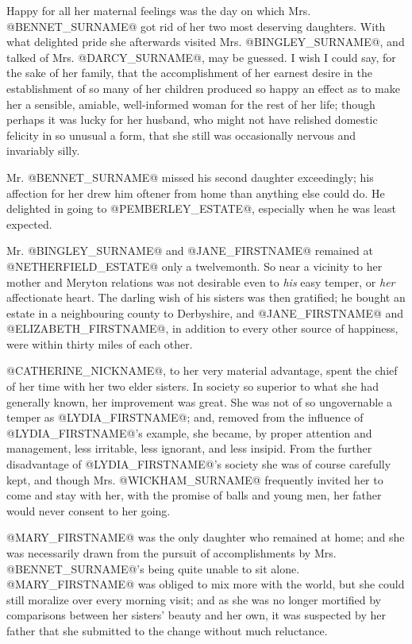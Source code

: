 Happy for all her maternal feelings was the day on which Mrs. @BENNET_SURNAME@ got
rid of her two most deserving daughters. With what delighted pride
she afterwards visited Mrs. @BINGLEY_SURNAME@, and talked of Mrs. @DARCY_SURNAME@, may
be guessed. I wish I could say, for the sake of her family, that the
accomplishment of her earnest desire in the establishment of so many
of her children produced so happy an effect as to make her a sensible,
amiable, well-informed woman for the rest of her life; though perhaps it
was lucky for her husband, who might not have relished domestic felicity
in so unusual a form, that she still was occasionally nervous and
invariably silly.

Mr. @BENNET_SURNAME@ missed his second daughter exceedingly; his affection for her
drew him oftener from home than anything else could do. He delighted in
going to @PEMBERLEY_ESTATE@, especially when he was least expected.

Mr. @BINGLEY_SURNAME@ and @JANE_FIRSTNAME@ remained at @NETHERFIELD_ESTATE@ only a twelvemonth. So near
a vicinity to her mother and Meryton relations was not desirable even to
\textit{his} easy temper, or \textit{her} affectionate heart. The darling wish of his
sisters was then gratified; he bought an estate in a neighbouring county
to Derbyshire, and @JANE_FIRSTNAME@ and @ELIZABETH_FIRSTNAME@, in addition to every other source
of happiness, were within thirty miles of each other.

@CATHERINE_NICKNAME@, to her very material advantage, spent the chief of her time with
her two elder sisters. In society so superior to what she had generally
known, her improvement was great. She was not of so ungovernable a
temper as @LYDIA_FIRSTNAME@; and, removed from the influence of @LYDIA_FIRSTNAME@'s example,
she became, by proper attention and management, less irritable, less
ignorant, and less insipid. From the further disadvantage of @LYDIA_FIRSTNAME@'s
society she was of course carefully kept, and though Mrs. @WICKHAM_SURNAME@
frequently invited her to come and stay with her, with the promise of
balls and young men, her father would never consent to her going.

@MARY_FIRSTNAME@ was the only daughter who remained at home; and she was necessarily
drawn from the pursuit of accomplishments by Mrs. @BENNET_SURNAME@'s being quite
unable to sit alone. @MARY_FIRSTNAME@ was obliged to mix more with the world, but
she could still moralize over every morning visit; and as she was no
longer mortified by comparisons between her sisters' beauty and her own,
it was suspected by her father that she submitted to the change without
much reluctance.

